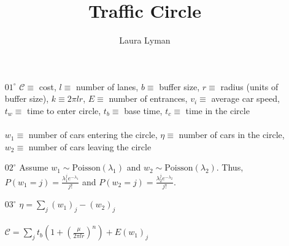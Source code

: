 \documentclass[11pt]{amsart}
\title{Traffic Circle}
\author{Laura Lyman}
\begin{document}
\maketitle
\begin{enumerate}
\item[$01^\circ$] $\mathcal{C} \equiv$ cost, $l \equiv$ number of lanes, $b \equiv $ buffer size, $r \equiv$ radius (units of buffer size), $k \equiv 2 \pi l r$, $E \equiv$ number of entrances, $v_i \equiv$ average car speed, $t_w \equiv$ time to enter circle, $t_b \equiv$ base time, $t_c \equiv$ time in the circle
\\ \\
$w_1 \equiv$ number of cars entering the circle, $\eta \equiv$ number of cars in the circle, $w_2 \equiv$ number of cars leaving the circle
\\ 
\item[$02^\circ$] Assume $w_1 \sim \text{Poisson}(\lambda_1)$ and $w_2 \sim \text{Poisson}(\lambda_2)$. Thus, $P(w_1 = j) = \displaystyle \frac{\lambda_1^j e^{-\lambda_1}}{j!}$ and $P(w_2 = j) = \displaystyle \frac{\lambda_2^j e^{-\lambda_2}}{j!}$.
 \\
\item[$03^\circ$] $\eta = \displaystyle \sum_j (w_1)_j - (w_2)_j$
\\ \\
$ \mathcal{C} = \displaystyle \sum_{j} t_b (1 + (\frac{\mu}{2 \pi l r})^n) + E (w_1)_j$
 
\end{enumerate}
\end{document}
